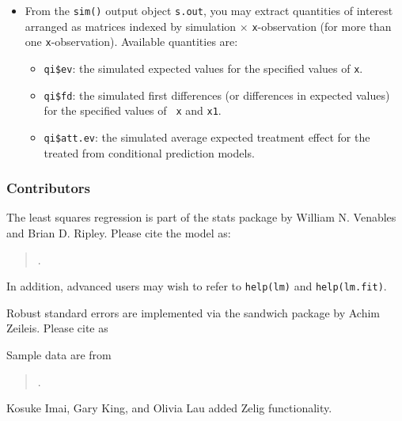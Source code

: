 \begin{itemize}
\item From the {\tt sim()} output object {\tt s.out}, you may extract
  quantities of interest arranged as matrices indexed by simulation
  $\times$ {\tt x}-observation (for more than one {\tt x}-observation).
  Available quantities are:

   \begin{itemize}
   \item {\tt qi\$ev}: the simulated expected values for the specified
     values of {\tt x}.
   \item {\tt qi\$fd}:  the simulated first differences (or
     differences in expected values) for the specified values of {\tt
       x} and {\tt x1}. 
   \item {\tt qi\$att.ev}: the simulated average expected treatment
     effect for the treated from conditional prediction models.  
   \end{itemize}
\end{itemize}
   
\subsubsection{Contributors}
     
The least squares regression is part of the stats package by William N.
Venables and Brian D. Ripley.  Please cite the model as:
\begin{verse}
.
\end{verse}

In addition, advanced users may wish to refer to
\texttt{help(lm)} and \texttt{help(lm.fit)}.

Robust standard errors are implemented via the sandwich package
by Achim Zeileis.  Please cite as
\begin{verse}
\end{verse}

Sample data are from 
\begin{verse}
.  
\end{verse}

Kosuke Imai, Gary King, and Olivia Lau added Zelig functionality.  





